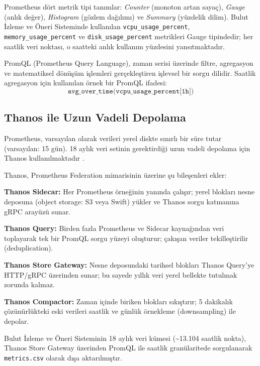 Prometheus dört metrik tipi tanımlar: \textit{Counter} (monoton artan sayaç), \textit{Gauge} (anlık değer), \textit{Histogram} (gözlem dağılımı) ve \textit{Summary} (yüzdelik dilim).
Bulut İzleme ve Öneri Sisteminde kullanılan \texttt{vcpu\_usage\_percent}, \texttt{memory\_usage\_percent} ve \texttt{disk\_usage\_percent} metrikleri Gauge tipindedir; her saatlik veri noktası, o saatteki anlık kullanım yüzdesini yansıtmaktadır.

PromQL (Prometheus Query Language), zaman serisi üzerinde filtre, agregasyon ve matematiksel dönüşüm işlemleri gerçekleştiren işlevsel bir sorgu dilidir.
Saatlik agregasyon için kullanılan örnek bir PromQL ifadesi:
\begin{equation}
    \texttt{avg\_over\_time(vcpu\_usage\_percent[1h])}
    \label{eq:promql}
\end{equation}

\subsection{Thanos ile Uzun Vadeli Depolama}

Prometheus, varsayılan olarak verileri yerel diskte sınırlı bir süre tutar (varsayılan: 15 gün).
18 aylık veri setinin gerektirdiği uzun vadeli depolama için Thanos kullanılmaktadır \autocite{thanos2024}.

Thanos, Prometheus Federation mimarisinin üzerine şu bileşenleri ekler:

\begin{maddelendir}[label=--]
    \item \textbf{Thanos Sidecar:} Her Prometheus örneğinin yanında çalışır; yerel blokları nesne deposuna (object storage: S3 veya Swift) yükler ve Thanos sorgu katmanına gRPC arayüzü sunar.
    \item \textbf{Thanos Query:} Birden fazla Prometheus ve Sidecar kaynağından veri toplayarak tek bir PromQL sorgu yüzeyi oluşturur; çakışan veriler tekilleştirilir (deduplication).
    \item \textbf{Thanos Store Gateway:} Nesne deposundaki tarihsel blokları Thanos Query'ye HTTP/gRPC üzerinden sunar; bu sayede yıllık veri yerel bellekte tutulmak zorunda kalmaz.
    \item \textbf{Thanos Compactor:} Zaman içinde biriken blokları sıkıştırır; 5 dakikalık çözünürlükteki eski verileri saatlik ve günlük örnekleme (downsampling) ile depolar.
\end{maddelendir}

Bulut İzleme ve Öneri Sisteminin 18 aylık veri kümesi (\textasciitilde13.104 saatlik nokta), Thanos Store Gateway üzerinden PromQL ile saatlik granülaritede sorgulanarak \texttt{metrics.csv} olarak dışa aktarılmıştır.


